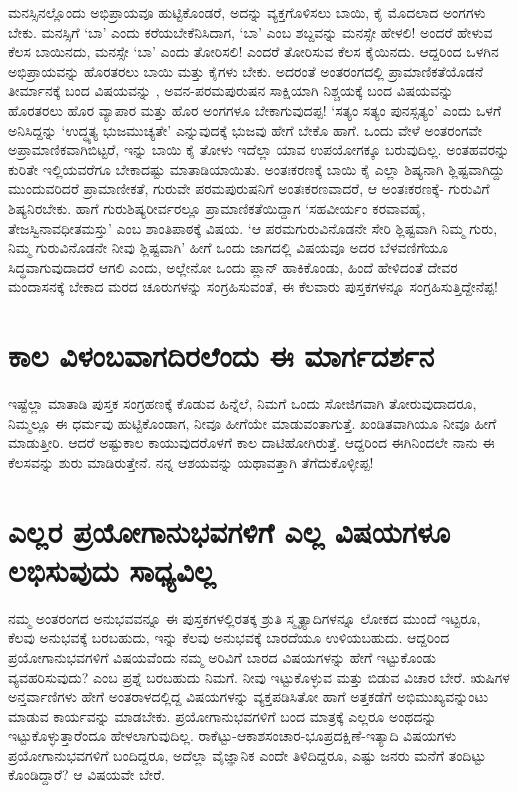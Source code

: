 ಮನಸ್ಸಿನಲ್ಲೊಂದು ಅಭಿಪ್ರಾಯವೂ ಹುಟ್ಟಿಕೊಂಡರೆ, ಅದನ್ನು ವ್ಯಕ್ತಗೊಳಿಸಲು ಬಾಯಿ, ಕೈ ಮೊದಲಾದ ಅಂಗಗಳು ಬೇಕು. ಮನಸ್ಸಿಗೆ `ಬಾ' ಎಂದು ಕರೆಯಬೇಕೆನಿಸಿದಾಗ, `ಬಾ' ಎಂಬ ಶಬ್ದವನ್ನು ಮನಸ್ಸೇ ಹೇಳಲಿ! ಅಂದರೆ ಹೇಳುವ ಕೆಲಸ ಬಾಯಿನದು, ಮನಸ್ಸೇ `ಬಾ' ಎಂದು ತೋರಿಸಲಿ! ಎಂದರೆ ತೋರಿಸುವ ಕೆಲಸ ಕೈಯಿನದು. ಆದ್ದರಿಂದ ಒಳಗಿನ ಅಭಿಪ್ರಾಯವನ್ನು ಹೊರತರಲು ಬಾಯಿ ಮತ್ತು ಕೈಗಳು ಬೇಕು. ಅದರಂತೆ ಅಂತರಂಗದಲ್ಲಿ ಪ್ರಾಮಾಣಿಕತೆಯೊಡನೆ ತೀರ್ಮಾನಕ್ಕೆ ಬಂದ ವಿಷಯವನ್ನು , ಅವನ-ಪರಮಪುರುಷನ ಸಾಕ್ಷಿಯಾಗಿ ನಿಶ್ಚಯಕ್ಕೆ ಬಂದ ವಿಷಯವನ್ನು ಹೊರತರಲು ಹೊರ ವ್ಯಾಪಾರ ಮತ್ತು ಹೊರ ಅಂಗಗಳೂ ಬೇಕಾಗುವುದಪ್ಪ! `ಸತ್ಯಂ ಸತ್ಯಂ ಪುನಸ್ಸತ್ಯಂ' ಎಂದು ಒಳಗೆ ಅನಿಸಿದ್ದನ್ನು `ಉದ್ಧ್ಯತ್ಯ ಭುಜಮುಚ್ಯತೇ'\label{130} ಎನ್ನುವುದಕ್ಕೆ ಭುಜವು ಹೇಗೆ ಬೇಕೊ ಹಾಗೆ. ಒಂದು ವೇಳೆ ಅಂತರಂಗವೇ ಅಪ್ರಾಮಾಣಿಕವಾಗಿಬಿಟ್ಟರೆ, ಇನ್ನು ಬಾಯಿ ಕೈ ತೋಳು ಇದೆಲ್ಲಾ ಯಾವ ಉಪಯೋಗಕ್ಕೂ ಬರುವುದಿಲ್ಲ. ಅಂತಹವರನ್ನು ಕುರಿತೇ ಇಲ್ಲಿಯವರೆಗೂ ಬೇಕಾದಷ್ಟು ಮಾತಾಡಿಯಾಯಿತು. ಅಂತಃಕರಣಕ್ಕೆ ಬಾಯಿ ಕೈ ಎಲ್ಲಾ ಶಿಷ್ಯನಾಗಿ ಶ್ಲಿಷ್ಟವಾಗಿದ್ದು ಮುಂದುವರಿದರೆ ಪ್ರಾಮಾಣೀಕತೆ, ಗುರುವೇ ಪರಮಪುರುಷನಿಗೆ ಅಂತಃಕರಣವಾದರೆ, ಆ ಅಂತಃಕರಣಕ್ಕೆ- ಗುರುವಿಗೆ ಶಿಷ್ಯನಿರಬೇಕು. ಹಾಗೆ ಗುರುಶಿಷ್ಯರೀರ್ವರಲ್ಲೂ ಪ್ರಾಮಾಣಿಕತೆಯಿದ್ದಾಗ `ಸಹವೀರ್ಯಂ ಕರವಾವಹೈ, ತೇಜಸ್ವಿನಾವಧೀತಮಸ್ತು'  ಎಂಬ ಶಾಂತಿಪಾಠಕ್ಕೆ ವಿಷಯ. `ಆ ಪರಮಗುರುವಿನೊಡನೇ ಸೇರಿ ಶ್ಲಿಷ್ಟವಾಗಿ ನಿಮ್ಮ ಗುರು, ನಿಮ್ಮ ಗುರುವಿನೊಡನೇ ನೀವು ಶ್ಲಿಷ್ಟವಾಗಿ' ಹೀಗೆ ಒಂದು ಜಾಗದಲ್ಲಿ ವಿಷಯವೂ ಅದರ ಬೆಳವಣಿಗೆಯೂ ಸಿದ್ಧವಾಗುವುದಾದರೆ ಆಗಲಿ ಎಂದು, ಅಲ್ಲೇನೋ ಒಂದು ಪ್ಲಾನ್ ಹಾಕಿಕೊಂಡು, ಹಿಂದೆ ಹೇಳಿದಂತೆ ದೇವರ ಮಂದಾಸನಕ್ಕೆ ಬೇಕಾದ ಮರದ ಚೂರುಗಳನ್ನು ಸಂಗ್ರಹಿಸುವಂತೆ, ಈ ಕೆಲವಾರು ಪುಸ್ತಕಗಳನ್ನೂ ಸಂಗ್ರಹಿಸುತ್ತಿದ್ದೇನೆಪ್ಪ!

\section*{ಕಾಲ ವಿಳಂಬವಾಗದಿರಲೆಂದು ಈ ಮಾರ್ಗದರ್ಶನ}

ಇಷ್ಟೆಲ್ಲಾ ಮಾತಾಡಿ ಪುಸ್ತಕ ಸಂಗ್ರಹಣಕ್ಕೆ ಕೊಡುವ ಹಿನ್ನೆಲೆ, ನಿಮಗೆ ಒಂದು ಸೋಜಿಗವಾಗಿ ತೋರುವುದಾದರೂ, ನಿಮ್ಮಲ್ಲೂ ಈ ಧರ್ಮವು ಹುಟ್ಟಿಕೊಂಡಾಗ, ನೀವೂ ಹೀಗೆಯೇ ಮಾಡುವಂತಾಗುತ್ತೆ. ಖಂಡಿತವಾಗಿಯೂ ನೀವೂ ಹೀಗೆ ಮಾಡುತ್ತೀರಿ. ಆದರೆ ಅಷ್ಟುಕಾಲ ಕಾಯುವುದರೊಳಗೆ ಕಾಲ ದಾಟಿಹೋಗಿರುತ್ತೆ. ಆದ್ದರಿಂದ ಈಗಿನಿಂದಲೇ ನಾನು ಈ ಕೆಲಸವನ್ನು ಶುರು ಮಾಡಿರುತ್ತೇನೆ. ನನ್ನ ಆಶಯವನ್ನು ಯಥಾವತ್ತಾಗಿ ತೆಗೆದುಕೊಳ್ಳೀಪ್ಪ!

\section*{ಎಲ್ಲರ ಪ್ರಯೋಗಾನುಭವಗಳಿಗೆ ಎಲ್ಲ ವಿಷಯಗಳೂ ಲಭಿಸುವುದು ಸಾಧ್ಯವಿಲ್ಲ}

ನಮ್ಮ ಅಂತರಂಗದ ಅನುಭವವನ್ನೂ ಈ ಪುಸ್ತಕಗಳಲ್ಲಿರತಕ್ಕ ಶ್ರುತಿ ಸ್ಮೃತ್ಯಾದಿಗಳನ್ನೂ ಲೋಕದ ಮುಂದೆ ಇಟ್ಟರೂ, ಕೆಲವು ಅನುಭವಕ್ಕೆ ಬರಬಹುದು, ಇನ್ನು ಕೆಲವು ಅನುಭವಕ್ಕೆ ಬಾರದೆಯೂ ಉಳಿಯಬಹುದು. ಆದ್ದರಿಂದ ಪ್ರಯೋಗಾನುಭವಗಳಿಗೆ ವಿಷಯವೆಂದು ನಮ್ಮ ಅರಿವಿಗೆ ಬಾರದ ವಿಷಯಗಳನ್ನು ಹೇಗೆ ಇಟ್ಟುಕೊಂಡು ವ್ಯವಹರಿಸುವುದು? ಎಂಬ ಪ್ರಶ್ನೆ ಬರಬಹುದು ನಿಮಗೆ. ನೀವು ಇಟ್ಟುಕೊಳ್ಳುವ ಮತ್ತು ಬಿಡುವ ವಿಚಾರ ಬೇರೆ. ಋಷಿಗಳ ಅನ್ತರ್ವಾಣಿಗಳು ಹೇಗೆ ಅಂತರಾಳದಲ್ಲಿದ್ದ ವಿಷಯಗಳನ್ನು  ವ್ಯಕ್ತಪಡಿಸಿತೋ ಹಾಗೆ ಅತ್ತಕಡೆಗೆ ಅಭಿಮುಖ್ಯವನ್ನುಂಟು ಮಾಡುವ ಕಾರ್ಯವನ್ನು ಮಾಡಬೇಕು. ಪ್ರಯೋಗಾನುಭವಗಳಿಗೆ ಬಂದ ಮಾತ್ರಕ್ಕೆ ಎಲ್ಲರೂ ಅಂಥದನ್ನು ಇಟ್ಟುಕೊಳ್ಳುತ್ತಾರೆಂದೂ ಹೇಳಲಾಗುವುದಿಲ್ಲ. ರಾಕೆಟ್ಟು-ಆಕಾಶಸಂಚಾರ-ಭೂಪ್ರದಕ್ಷಿಣೆ-ಇತ್ಯಾದಿ ವಿಷಯಗಳು ಪ್ರಯೋಗಾನುಭವಗಳಿಗೆ ಬಂದಿದ್ದರೂ, ಅದೆಲ್ಲಾ ವೈಜ್ಞಾನಿಕ ಎಂದೇ ತಿಳಿದಿದ್ದರೂ, ಎಷ್ಟು ಜನರು ಮನೆಗೆ ತಂದಿಟ್ಟು ಕೊಂಡಿದ್ದಾರೆ? ಆ ವಿಷಯವೇ ಬೇರೆ.

